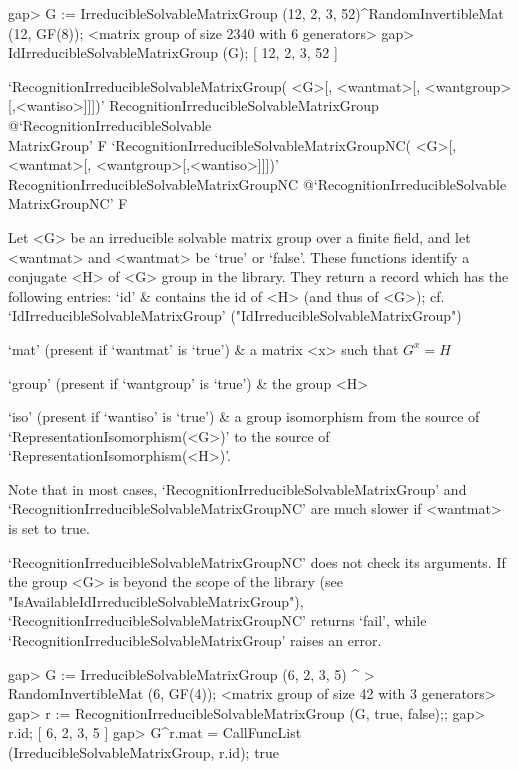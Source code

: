 \beginexample
gap> G := IrreducibleSolvableMatrixGroup (12, 2, 3, 52)^RandomInvertibleMat (12, GF(8));
<matrix group of size 2340 with 6 generators>
gap> IdIrreducibleSolvableMatrixGroup (G);
[ 12, 2, 3, 52 ]
\endexample


\>`RecognitionIrreducibleSolvableMatrixGroup(%
   <G>[, <wantmat>[, <wantgroup>[,<wantiso>]]])'%
{RecognitionIrreducibleSolvableMatrixGroup}%
@{`RecognitionIrreducibleSolvable\\MatrixGroup'} F
\>`RecognitionIrreducibleSolvableMatrixGroupNC(%
   <G>[, <wantmat>[, <wantgroup>[,<wantiso>]]])'%
{RecognitionIrreducibleSolvableMatrixGroupNC}%
@{`RecognitionIrreducibleSolvable\\MatrixGroupNC'} F

Let <G> be an irreducible solvable matrix group over a finite field, and let
<wantmat> and <wantmat> be `true' or `false'. 
These functions identify a conjugate <H> of <G> group in the library. 
They return a record which has the following entries:
\beginitems
`id' &  contains the id of <H> (and thus of <G>); 
    cf. `IdIrreducibleSolvableMatrixGroup'  ("IdIrreducibleSolvableMatrixGroup")

`mat' (present if `wantmat' is `true') &
    a matrix <x> such that $G^x = H$

`group' (present if `wantgroup' is `true') & the group <H> 

`iso' (present if `wantiso' is `true') & a group isomorphism from the source of
    `RepresentationIsomorphism(<G>)' to the source of `RepresentationIsomorphism(<H>)'.
    
\enditems
Note that in most cases, `RecognitionIrreducibleSolvableMatrixGroup' and `RecognitionIrreducibleSolvableMatrixGroupNC' are 
much slower if <wantmat> is set to true.   

`RecognitionIrreducibleSolvableMatrixGroupNC' does not check its arguments. If
the group <G> is beyond the scope of the {\IRREDSOL} library (see "IsAvailableIdIrreducibleSolvableMatrixGroup"), `RecognitionIrreducibleSolvableMatrixGroupNC' returns `fail', while `RecognitionIrreducibleSolvableMatrixGroup' raises an error.

\beginexample
gap> G := IrreducibleSolvableMatrixGroup (6, 2, 3, 5) ^
>         RandomInvertibleMat (6, GF(4));
<matrix group of size 42 with 3 generators>
gap> r := RecognitionIrreducibleSolvableMatrixGroup (G, true, false);;
gap> r.id;
[ 6, 2, 3, 5 ]
gap> G^r.mat = CallFuncList (IrreducibleSolvableMatrixGroup, r.id);
true
\endexample



